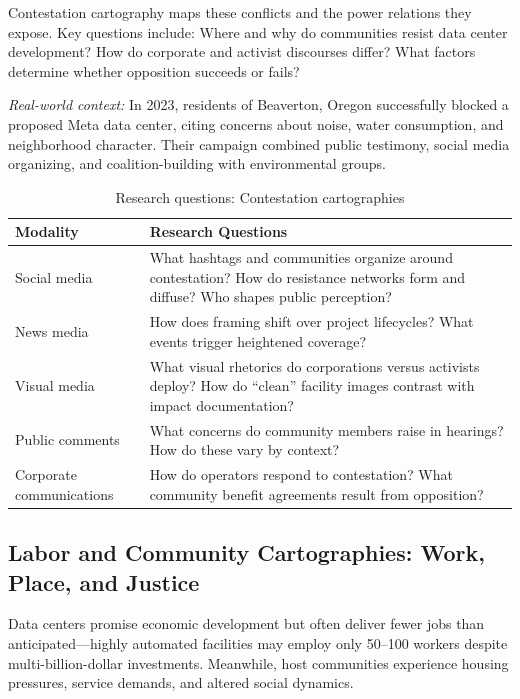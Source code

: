 \documentclass[review]{elsarticle}
\begin{document}
Contestation cartography maps these conflicts and the power relations they expose. Key questions include: Where and why do communities resist data center development? How do corporate and activist discourses differ? What factors determine whether opposition succeeds or fails?

\textit{Real-world context:} In 2023, residents of Beaverton, Oregon successfully blocked a proposed Meta data center, citing concerns about noise, water consumption, and neighborhood character. Their campaign combined public testimony, social media organizing, and coalition-building with environmental groups.

\begin{table}[h]
\caption{Research questions: Contestation cartographies}
\label{tab:contestation}
\begin{tabular}{p{3cm}p{9cm}}
\toprule
\textbf{Modality} & \textbf{Research Questions} \\
\midrule
Social media & What hashtags and communities organize around contestation? How do resistance networks form and diffuse? Who shapes public perception? \\
\addlinespace
News media & How does framing shift over project lifecycles? What events trigger heightened coverage? \\
\addlinespace
Visual media & What visual rhetorics do corporations versus activists deploy? How do ``clean'' facility images contrast with impact documentation? \\
\addlinespace
Public comments & What concerns do community members raise in hearings? How do these vary by context? \\
\addlinespace
Corporate communications & How do operators respond to contestation? What community benefit agreements result from opposition? \\
\bottomrule
\end{tabular}
\end{table}

\subsection{Labor and Community Cartographies: Work, Place, and Justice}

Data centers promise economic development but often deliver fewer jobs than anticipated---highly automated facilities may employ only 50--100 workers despite multi-billion-dollar investments. Meanwhile, host communities experience housing pressures, service demands, and altered social dynamics.
\end{document}
